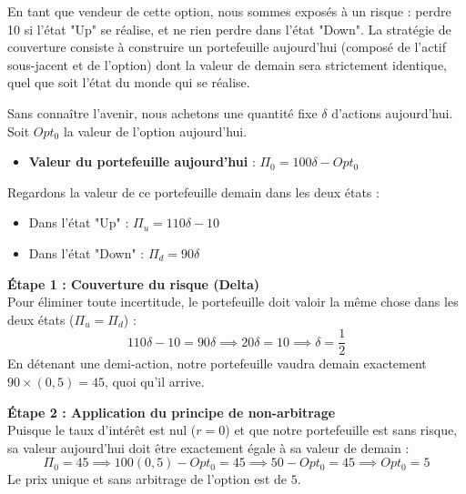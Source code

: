 \begin{intuitionbox}
En tant que vendeur de cette option, nous sommes exposés à un risque : perdre 10 si l'état "Up" se réalise, et ne rien perdre dans l'état "Down". La stratégie de couverture consiste à construire un portefeuille aujourd'hui (composé de l'actif sous-jacent et de l'option) dont la valeur de demain sera strictement identique, quel que soit l'état du monde qui se réalise.
\end{intuitionbox}

\begin{proofbox}
Sans connaître l'avenir, nous achetons une quantité fixe $\delta$ d'actions aujourd'hui. Soit $Opt_0$ la valeur de l'option aujourd'hui.
\begin{itemize}[label=$\rightarrow$]
    \item \textbf{Valeur du portefeuille aujourd'hui} : $\Pi_0 = 100\delta - Opt_0$
\end{itemize}
Regardons la valeur de ce portefeuille demain dans les deux états :
\begin{itemize}[label=$\rightarrow$]
    \item Dans l'état "Up" : $\Pi_u = 110\delta - 10$
    \item Dans l'état "Down" : $\Pi_d = 90\delta$
\end{itemize}

\textbf{Étape 1 : Couverture du risque (Delta)}\\
Pour éliminer toute incertitude, le portefeuille doit valoir la même chose dans les deux états ($\Pi_u = \Pi_d$) :
\begin{equation*}
    110\delta - 10 = 90\delta \implies 20\delta = 10 \implies \delta = \frac{1}{2}
\end{equation*}
En détenant une demi-action, notre portefeuille vaudra demain exactement $90 \times (0,5) = 45$, quoi qu'il arrive.

\textbf{Étape 2 : Application du principe de non-arbitrage}\\
Puisque le taux d'intérêt est nul ($r=0$) et que notre portefeuille est sans risque, sa valeur aujourd'hui doit être exactement égale à sa valeur de demain :
\begin{equation*}
    \Pi_0 = 45 \implies 100(0,5) - Opt_0 = 45 \implies 50 - Opt_0 = 45 \implies Opt_0 = 5
\end{equation*}
Le prix unique et sans arbitrage de l'option est de $5$.
\end{proofbox}

